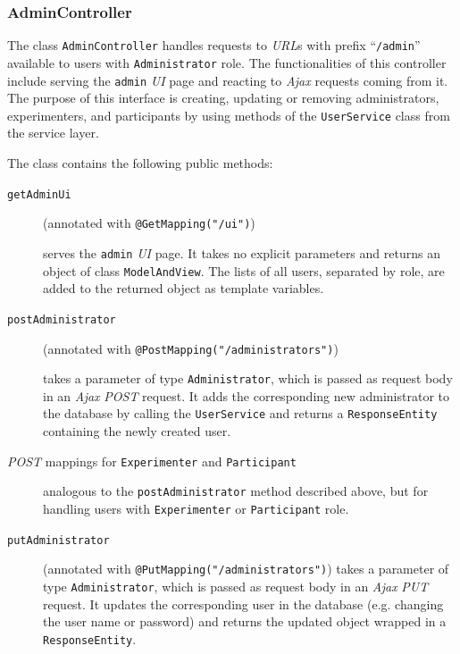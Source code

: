 \documentclass[a4paper]{usiinfbachelorproject}
\begin{document}
\subsubsection{\textbf{AdminController}}

The class \texttt{AdminController} handles requests to \emph{URL}s with prefix ``\texttt{/admin}'' available to users with \texttt{Administrator} role.
The functionalities of this controller include serving the \texttt{admin} \emph{UI} page and reacting to \emph{Ajax} requests coming from it.
The purpose of this interface is creating, updating or removing administrators, experimenters, 
and participants by using methods of the \texttt{UserService} class
from the service layer.

The class contains the following public methods:

    \begin{description}

        \item[\texttt{getAdminUi}]
        (annotated with \texttt{@GetMapping("/ui")}) 

        serves the \texttt{admin} \emph{UI} page. It takes no explicit parameters and returns an object
        of class \texttt{ModelAndView}. The lists of all users, separated by role, are added to the returned object as template variables.

        \item[\texttt{postAdministrator}]
        (annotated with \texttt{@PostMapping("/administrators")}) 

        takes a parameter of type \texttt{Administrator},
        which is passed as request body in an \emph{Ajax} \emph{POST} request. It adds
        the corresponding new administrator to the database by calling the \texttt{UserService} and returns a \texttt{ResponseEntity}
        containing the newly created user. 

        \item[\emph{POST} mappings for \texttt{Experimenter} and \texttt{Participant}] analogous to the \texttt{postAdministrator} method
        described above, but for handling users with \texttt{Experimenter} or \texttt{Participant} role.

        \item[\texttt{putAdministrator}] 
        (annotated with \texttt{@PutMapping("/administrators")}) takes a parameter of type \texttt{Administrator},
        which is passed as request body in an \emph{Ajax} \emph{PUT} request. It updates the corresponding
        user in the database (e.g. changing the user name or password) and returns the updated object wrapped
        in a \texttt{ResponseEntity}.


\end{description}
\end{document}
